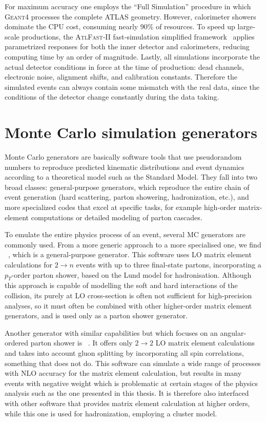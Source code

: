 For maximum accuracy one employs the “Full Simulation” procedure in which \textsc{Geant4} processes the complete ATLAS geometry.  However, calorimeter showers dominate the CPU cost, consuming nearly 90\% of resources.  To speed up large‐scale productions, the \textsc{AtlFast‐II} fast‐simulation simplified framework~\cite{Edmonds:1091969,ATLAS:1300517} applies parametrized responses for both the inner detector and calorimeters, reducing computing time by an order of magnitude.  Lastly, all simulations incorporate the actual detector conditions in force at the time of production: dead channels, electronic noise, alignment shifts, and calibration constants. Therefore the simulated events can always contain some mismatch with the real data, since the conditions of the detector change constantly during the data taking.


\section{Monte Carlo simulation generators}
\label{sec:mc}
Monte Carlo generators are basically software tools that use pseudorandom numbers to reproduce predicted kinematic distributions and event dynamics according to a theoretical model such as the Standard Model.  They fall into two broad classes: general‐purpose generators, which reproduce the entire chain of event generation (hard scattering, parton showering, hadronization, etc.), and more specialized codes that excel at specific tasks, for example high‐order matrix‐element computations or detailed modeling of parton cascades.

To emulate the entire physics process of an event, several MC generators are commonly used. From a more generic approach to a more specialised one, we find \pythia~\cite{SJOSTRAND2015159}, which is a general-purpose generator.
This software uses LO matrix element calculations for $2 \rightarrow n$ events with up to three final-state partons, incorporating a $p_{T}$-order parton shower, based on the Lund model for hadronisation. Although this approach is capable of modelling the soft and hard interactions of the collision, its purely at LO cross-section is often not sufficient for high-precision analyses, so it must often be combined with other higher-order matrix element generators, and is used only as a parton shower generator.

Another generator with similar capabilities but which focuses on an angular-ordered parton shower is \herwig~\cite{B_hr_2008}. It offers only $2 \rightarrow 2$ LO matrix element calculations and takes into account gluon splitting by incorporating all spin correlations, something that \pythia does not do. This software can simulate 
a wide range of processes with NLO accuracy for the matrix element calculation, but results in many events with negative weight which is problematic at certain stages of the physics analysis such as the one presented in this thesis. It is therefore also interfaced with other software that provides matrix element calculation at higher orders, while this one is used for hadronization, employing a cluster model.

